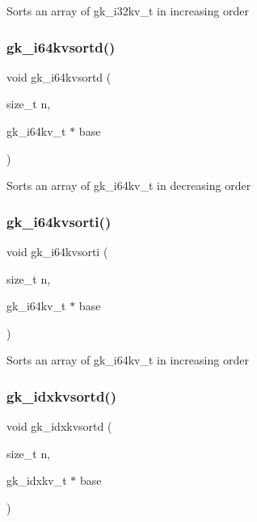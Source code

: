 Sorts an array of gk\+\_\+i32kv\+\_\+t in increasing order \mbox{\label{a00140_a7fa957686d304c93a52441fa6fce6652}} 
\subsubsection{\texorpdfstring{gk\+\_\+i64kvsortd()}{gk\_i64kvsortd()}}
{\footnotesize\ttfamily void gk\+\_\+i64kvsortd (\begin{DoxyParamCaption}\item[{size\+\_\+t}]{n,  }\item[{gk\+\_\+i64kv\+\_\+t $\ast$}]{base }\end{DoxyParamCaption})}

Sorts an array of gk\+\_\+i64kv\+\_\+t in decreasing order \mbox{\label{a00140_a442355d8561580d45d5a75afb5fb9698}} 
\subsubsection{\texorpdfstring{gk\+\_\+i64kvsorti()}{gk\_i64kvsorti()}}
{\footnotesize\ttfamily void gk\+\_\+i64kvsorti (\begin{DoxyParamCaption}\item[{size\+\_\+t}]{n,  }\item[{gk\+\_\+i64kv\+\_\+t $\ast$}]{base }\end{DoxyParamCaption})}

Sorts an array of gk\+\_\+i64kv\+\_\+t in increasing order \mbox{\label{a00140_adf1ba87bf59cbb6c93372843224adbc7}} 
\subsubsection{\texorpdfstring{gk\+\_\+idxkvsortd()}{gk\_idxkvsortd()}}
{\footnotesize\ttfamily void gk\+\_\+idxkvsortd (\begin{DoxyParamCaption}\item[{size\+\_\+t}]{n,  }\item[{gk\+\_\+idxkv\+\_\+t $\ast$}]{base }\end{DoxyParamCaption})}


